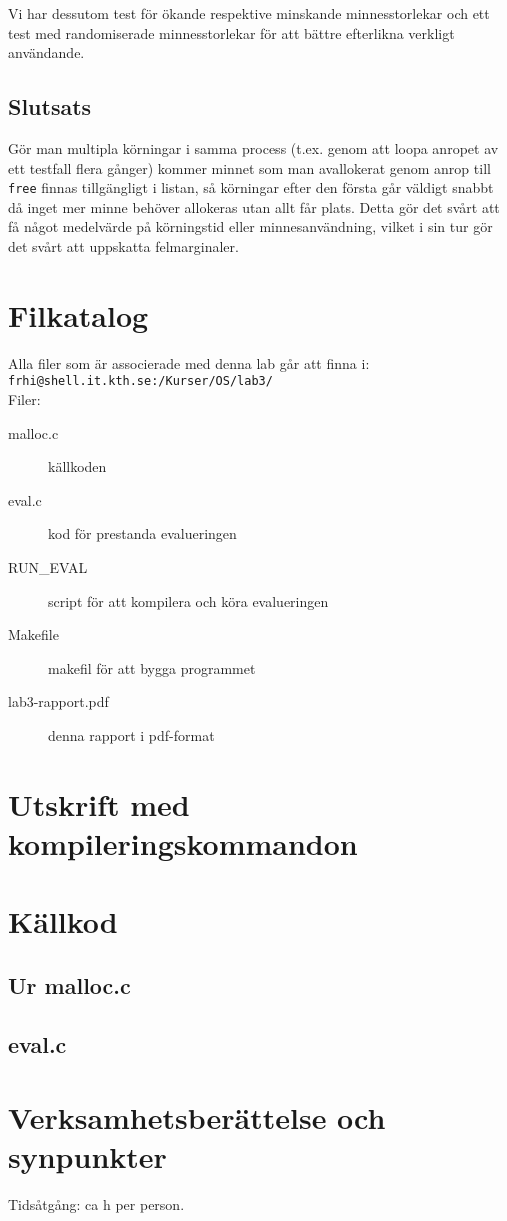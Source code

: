 \documentclass[a4paper]{article}
\begin{document}
Vi har dessutom test för ökande respektive minskande minnesstorlekar och ett test med randomiserade minnesstorlekar för att bättre efterlikna verkligt användande.

\subsection*{Slutsats}
Gör man multipla körningar i samma process (t.ex. genom att loopa anropet av ett testfall flera gånger) kommer minnet som man avallokerat genom anrop till \texttt{free} finnas tillgängligt i listan, så körningar efter den första går väldigt snabbt då inget mer minne behöver allokeras utan allt får plats.
Detta gör det svårt att få något medelvärde på körningstid eller minnesanvändning, vilket i sin tur gör det svårt att uppskatta felmarginaler.

\section*{Filkatalog}
Alla filer som är associerade med denna lab går att finna i:\\
\texttt{frhi@shell.it.kth.se:/Kurser/OS/lab3/}
\\
Filer:
\begin{description}
\item[malloc.c] källkoden
\item[eval.c] kod för prestanda evalueringen
\item[RUN\_EVAL] script för att kompilera och köra evalueringen
\item[Makefile] makefil för att bygga programmet
\item[lab3-rapport.pdf] denna rapport i pdf-format
\end{description}

\section*{Utskrift med kompileringskommandon}


\section*{Källkod}
\subsection*{Ur malloc.c}


\subsection*{eval.c}


\section*{Verksamhetsberättelse och synpunkter}
Tidsåtgång: ca h per person.
\end{document}
